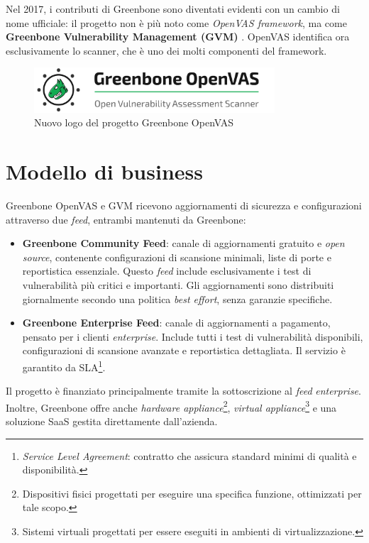Nel 2017, i contributi di Greenbone sono diventati evidenti con un cambio di nome ufficiale: il progetto non è più noto come \emph{OpenVAS framework}, ma come \textbf{Greenbone Vulnerability Management (GVM)} \cite{openvas-history}. OpenVAS identifica ora esclusivamente lo scanner, che è uno dei molti componenti del framework.

\begin{figure}
    \centering
    \includegraphics[width=0.8\textwidth]{img/greenbone_logo.png}
    \caption{Nuovo logo del progetto Greenbone OpenVAS}
\end{figure}

\section{Modello di business}
Greenbone OpenVAS e GVM ricevono aggiornamenti di sicurezza e configurazioni attraverso due \emph{feed}, entrambi mantenuti da Greenbone:
\label{feed}

\begin{itemize}
    \item \textbf{Greenbone Community Feed}: canale di aggiornamenti gratuito e \emph{open source}, contenente configurazioni di scansione minimali, liste di porte e reportistica essenziale. Questo \emph{feed} include esclusivamente i test di vulnerabilità più critici e importanti. Gli aggiornamenti sono distribuiti giornalmente secondo una politica \emph{best effort}, senza garanzie specifiche.
    \item \textbf{Greenbone Enterprise Feed}: canale di aggiornamenti a pagamento, pensato per i clienti \emph{enterprise}. Include tutti i test di vulnerabilità disponibili, configurazioni di scansione avanzate e reportistica dettagliata. Il servizio è garantito da SLA\footnote{\emph{Service Level Agreement}: contratto che assicura standard minimi di qualità e disponibilità.}.
\end{itemize}

Il progetto è finanziato principalmente tramite la sottoscrizione al \emph{feed} \emph{enterprise}. Inoltre, Greenbone offre anche \emph{hardware appliance}\footnote{Dispositivi fisici progettati per eseguire una specifica funzione, ottimizzati per tale scopo.}, \emph{virtual appliance}\footnote{Sistemi virtuali progettati per essere eseguiti in ambienti di virtualizzazione.} e una soluzione SaaS gestita direttamente dall'azienda.

